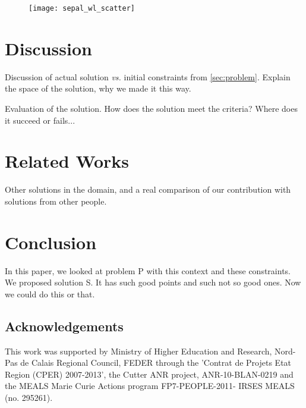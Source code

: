 \documentclass{article}
\begin{document}
\begin{figure}[H]
  \begin{center}
  \texttt{[image: sepal\_wl\_scatter]}
  \end{center}
\end{figure}

\section{Discussion}
\label{sec:discussion}

Discussion of actual solution \emph{vs.} initial constraints from
\ref{sec:problem}. Explain the space of the solution, why we made it this way.

Evaluation of the solution. How does the solution meet the criteria? Where
does it succeed or fails...


\section{Related Works}
\label{sec:related}

Other solutions in the domain, and a real comparison of our contribution with
solutions from other people.


\section{Conclusion}
\label{sec:conclusion}

In this paper, we \textsf{looked}\xspace at problem P with this context and these
constraints. We proposed solution S. It has such good points and such not so
good ones. Now we could do this or that.


%

\subsection*{Acknowledgements} This work was supported by Ministry of Higher Education and Research, Nord-Pas de Calais Regional Council, FEDER through the 'Contrat de
Projets Etat Region (CPER) 2007-2013',  the Cutter ANR project, ANR-10-BLAN-0219 and the MEALS Marie Curie Actions program FP7-PEOPLE-2011-
IRSES MEALS (no. 295261). 

% 
% 

% 



\end{document}
